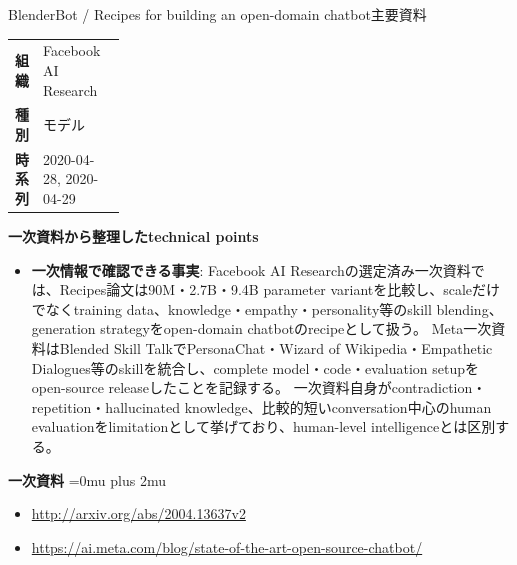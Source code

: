 \begin{technicalnote}{BlenderBot / Recipes for building an open-domain chatbot}{主要資料}
\begingroup
\begin{tabularx}{\linewidth}{@{}>{\bfseries}p{0.22\linewidth}X@{}}
組織 & Facebook AI Research \\
種別 & モデル \\
時系列 & 2020-04-28, 2020-04-29 \\
\end{tabularx}
\smallskip
\begin{minipage}{\linewidth}
{\bfseries 一次資料から整理したtechnical points}
\begin{itemize}[leftmargin=1.5em,itemsep=0.35em]
\item \textbf{一次情報で確認できる事実}: Facebook AI Researchの選定済み一次資料では、Recipes論文は90M・2.7B・9.4B parameter variantを比較し、scaleだけでなくtraining data、knowledge・empathy・personality等のskill blending、generation strategyをopen-domain chatbotのrecipeとして扱う。 Meta一次資料はBlended Skill TalkでPersonaChat・Wizard of Wikipedia・Empathetic Dialogues等のskillを統合し、complete model・code・evaluation setupをopen-source releaseしたことを記録する。 一次資料自身がcontradiction・repetition・hallucinated knowledge、比較的短いconversation中心のhuman evaluationをlimitationとして挙げており、human-level intelligenceとは区別する。
\end{itemize}
\begin{samepage}
{\bfseries 一次資料}
\begingroup\sloppy
\Urlmuskip=0mu plus 2mu\relax
\begin{itemize}[leftmargin=1.5em,itemsep=0.25em]
\item {\scriptsize\url{http://arxiv.org/abs/2004.13637v2}}
\item {\scriptsize\url{https://ai.meta.com/blog/state-of-the-art-open-source-chatbot/}}
\end{itemize}
\endgroup
\end{samepage}
\end{minipage}
\endgroup
\end{technicalnote}
\medskip
